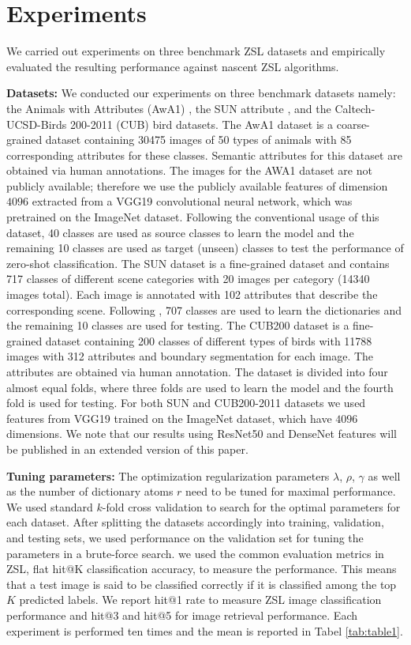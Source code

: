 \documentclass[letterpaper]{article} %
\begin{document}
\section{Experiments}
\label{sec:results}
We carried out experiments on three benchmark ZSL datasets and empirically evaluated the resulting performance against  nascent ZSL  algorithms.

{\bf Datasets:} We conducted our experiments on three benchmark datasets namely: the Animals with Attributes (AwA1) \cite{lampertattribute}, the SUN attribute \cite{patterson2012sun}, and the Caltech-UCSD-Birds 200-2011 (CUB)  bird \cite{wah2011caltech} datasets. The AwA1 dataset is a coarse-grained dataset containing 30475 images of 50 types of animals with 85 corresponding attributes for these classes. Semantic attributes for this dataset are obtained via human annotations. The images for the AWA1 dataset are not publicly available; therefore we use the publicly available features of dimension $4096$ extracted from a VGG19 convolutional neural network, which was pretrained on the ImageNet dataset. Following the conventional usage of this dataset, 40 classes are used as source classes to learn the model and the remaining 10 classes are  used as target (unseen) classes to test the performance of zero-shot classification. The SUN dataset is a fine-grained dataset and contains 717 classes of different scene categories with 20 images per category (14340 images total).  Each image is annotated with 102 attributes that describe the corresponding scene. Following \cite{lampertattribute}, 707 classes are used to learn the dictionaries and the remaining 10 classes are used for testing. The CUB200 dataset is a fine-grained dataset containing 200 classes of different types of birds with 11788 images with 312 attributes and boundary segmentation for each image. The attributes are obtained via human annotation. The dataset is divided into four almost equal folds, where three folds are used to learn the model and the fourth fold is used for testing. For both SUN and CUB200-2011 datasets we used features from VGG19 trained on the ImageNet dataset, which have $4096$ dimensions. We note that our results using ResNet50 and DenseNet \cite{huang2017densely} features will be published in an extended version of this paper. 

 {\bf Tuning parameters:} The optimization regularization parameters $\lambda$, $\rho$, $\gamma$ as well as the number of dictionary atoms $r$ need to be tuned for maximal performance. We used standard $k$-fold cross validation to search for the optimal   parameters for each dataset. After splitting the datasets accordingly into training, validation, and testing sets, we used performance on the validation set for tuning the parameters in a brute-force search. 
we used the common  evaluation metrics in ZSL,  flat hit@K classification accuracy, to measure the performance. This means that a test image is said to be classified correctly  if it is classified among the top $K$ predicted labels. We report hit@1   rate to measure ZSL image classification performance and hit@3 and hit@5 for image retrieval performance. Each experiment is performed ten times and the mean is reported in Tabel \ref{tab:table1}.
\end{document}
